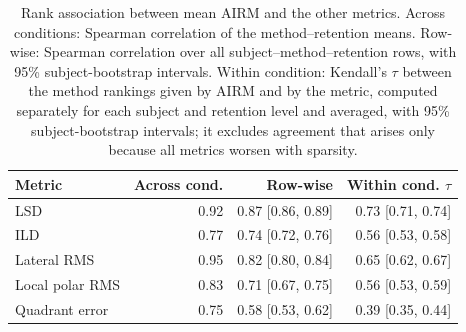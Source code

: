 \begin{table}[!t]
\centering
\caption{Rank association between mean AIRM and the other metrics. Across conditions: Spearman correlation of the method--retention means. Row-wise: Spearman correlation over all subject--method--retention rows, with 95\% subject-bootstrap intervals. Within condition: Kendall's \(\tau\) between the method rankings given by AIRM and by the metric, computed separately for each subject and retention level and averaged, with 95\% subject-bootstrap intervals; it excludes agreement that arises only because all metrics worsen with sparsity.}
\label{tab:metric_correlations}
\scriptsize
\setlength{\tabcolsep}{3pt}
\begin{tabular}{lrrr}
\toprule
Metric & Across cond. & Row-wise & Within cond. \(\tau\) \\
\midrule
LSD & 0.92 & 0.87 [0.86, 0.89] & 0.73 [0.71, 0.74] \\
ILD & 0.77 & 0.74 [0.72, 0.76] & 0.56 [0.53, 0.58] \\
Lateral RMS & 0.95 & 0.82 [0.80, 0.84] & 0.65 [0.62, 0.67] \\
Local polar RMS & 0.83 & 0.71 [0.67, 0.75] & 0.56 [0.53, 0.59] \\
Quadrant error & 0.75 & 0.58 [0.53, 0.62] & 0.39 [0.35, 0.44] \\
\bottomrule
\end{tabular}
\end{table}
